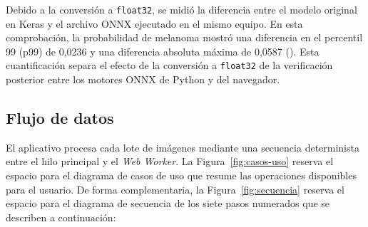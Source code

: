 Debido a la conversión a \texttt{float32}, se midió la diferencia entre el modelo original en Keras y el archivo ONNX ejecutado en el mismo equipo. En esta comprobación, la probabilidad de melanoma mostró una diferencia en el percentil 99 (p99) de 0,0236 y una diferencia absoluta máxima de 0,0587 (). Esta cuantificación separa el efecto de la conversión a \texttt{float32} de la verificación posterior entre los motores ONNX de Python y del navegador.

\subsection{Flujo de datos}

El aplicativo procesa cada lote de imágenes mediante una secuencia determinista entre el hilo principal y el \textit{Web Worker}. La Figura~\ref{fig:casos-uso} reserva el espacio para el diagrama de casos de uso que resume las operaciones disponibles para el usuario. De forma complementaria, la Figura~\ref{fig:secuencia} reserva el espacio para el diagrama de secuencia de los siete pasos numerados que se describen a continuación:

